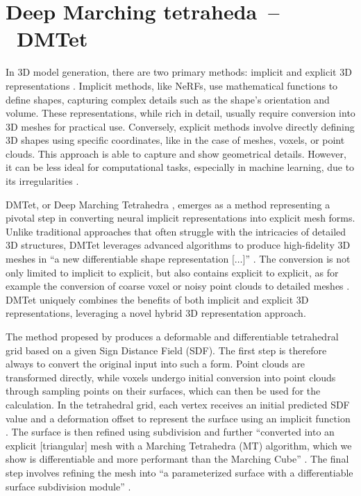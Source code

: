 \section{Deep Marching tetraheda~--~DMTet}\label{DMTet}

In 3D model generation, there are two primary methods: implicit and explicit 3D representations \citep{shen2021DMTet}. Implicit methods, like NeRFs, use mathematical functions to define shapes, capturing complex details such as the shape's orientation and volume. These representations, while rich in detail, usually require conversion into 3D meshes for practical use. Conversely, explicit methods involve directly defining 3D shapes using specific coordinates, like in the case of meshes, voxels, or point clouds. This approach is able to capture and show geometrical details. However, it can be less ideal for computational tasks, especially in machine learning, due to its irregularities \citep{michalkiewicz2019deep}.

DMTet, or Deep Marching Tetrahedra \citep{shen2021DMTet}, emerges as a method representing a pivotal step in converting neural implicit representations into explicit mesh forms. Unlike traditional approaches that often struggle with the intricacies of detailed 3D structures, DMTet leverages advanced algorithms to produce high-fidelity 3D meshes in ``a new differentiable shape representation [\(\ldots\)]'' \citep{shen2021DMTet}. The conversion is not only limited to implicit to explicit, but also contains explicit to explicit, as for example the conversion of coarse voxel or noisy point clouds to detailed meshes \citep{shen2021DMTet}. DMTet uniquely combines the benefits of both implicit and explicit 3D representations, leveraging a novel hybrid 3D representation approach.



The method propesed by \citeauthor{shen2021DMTet} produces a deformable and differentiable tetrahedral grid based on a given Sign Distance Field (SDF). The first step is therefore always to convert the original input into such a form. Point clouds are transformed directly, while voxels undergo initial conversion into point clouds through sampling points on their surfaces, which can then be used for the calculation. In the tetrahedral grid, each vertex receives an initial predicted SDF value and a deformation offset to represent the surface using an implicit function \citep{shen2021DMTet}. The surface is then refined using subdivision and further ``converted into an explicit [triangular] mesh with a Marching Tetrahedra (MT) algorithm, which we show is differentiable and more performant than the Marching Cube'' \citep{shen2021DMTet}. The final step involves refining the mesh into ``a parameterized surface with a differentiable surface subdivision module'' \citep{shen2021DMTet}.

